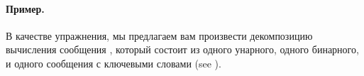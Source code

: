 \documentclass[a4paper,10pt,twoside]{book}
\begin{document}



\paragraph{Пример.} В качестве упражнения, мы предлагаем вам произвести декомпозицию вычисления сообщения , который состоит из одного унарного, одного бинарного, и одного сообщения с ключевыми словами (see ).

\end{document}
